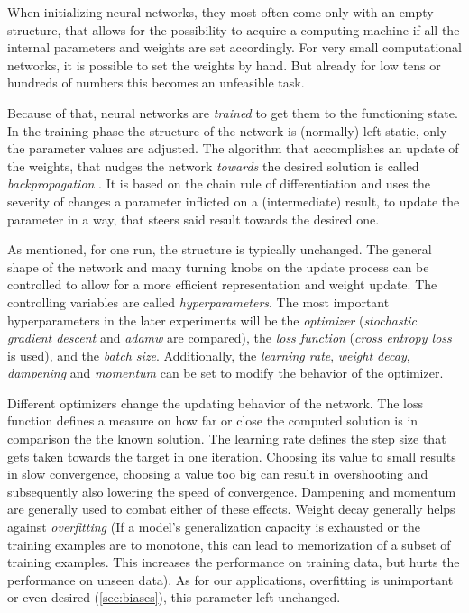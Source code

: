 When initializing neural networks, they most often come only with an empty structure, that allows for the possibility to acquire a computing machine if all the internal parameters and weights are set accordingly.
For very small computational networks, it is possible to set the weights by hand.
But already for low tens or hundreds of numbers this becomes an unfeasible task. 

Because of that, neural networks are \emph{trained} to get them to the functioning state. In the training phase the structure of the network is (normally) left static, only the parameter values are adjusted. 
The algorithm that accomplishes an update of the weights, that nudges the network \emph{towards} the desired solution is called \emph{backpropagation} \cite{machineLearningMitchell}.
It is based on the chain rule of differentiation and uses the severity of changes a parameter inflicted on a (intermediate) result, to update the parameter in a way, that steers said result towards the desired one. 

As mentioned, for one run, the structure is typically unchanged. 
The general shape of the network and many turning knobs on the update process can be controlled to allow for a more efficient representation and weight update.
The controlling variables are called \emph{hyperparameters}.
The most important hyperparameters in the later experiments will be the \emph{optimizer} (\emph{stochastic gradient descent} and \emph{adamw} \cite{adamwOptimizer} are compared), the \emph{loss function} (\emph{cross entropy loss} is used), and the \emph{batch size}. 
Additionally, the \emph{learning rate}, \emph{weight decay}, \emph{dampening} and \emph{momentum} can be set to modify the behavior of the optimizer.

Different optimizers change the updating behavior of the network. 
The loss function defines a measure on how far or close the computed solution is in comparison the the known solution.
The learning rate defines the step size that gets taken towards the target in one iteration.
Choosing its value to small results in slow convergence, choosing a value too big can result in overshooting and subsequently also lowering the speed of convergence.
Dampening and momentum are generally used to combat either of these effects.
Weight decay generally helps against \emph{overfitting} (If a model's generalization capacity is exhausted or the training examples are to monotone, this can lead to memorization of a subset of training examples. This increases the performance on training data, but hurts the performance on unseen data). 
As for our applications, overfitting is unimportant or even desired (\autoref{sec:biases}), this parameter left unchanged.

